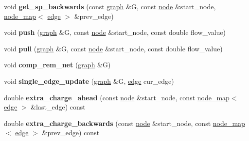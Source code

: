 \begin{DoxyCompactItemize}
\item 
\mbox{\label{classmaxflow__pp_a58b7af1b215766e99adcca0994ecfb7a}} 
void {\bfseries get\+\_\+sp\+\_\+backwards} (const \mbox{\hyperlink{classgraph}{graph}} \&G, const \mbox{\hyperlink{classnode}{node}} \&start\+\_\+node, \mbox{\hyperlink{classnode__map}{node\+\_\+map}}$<$ \mbox{\hyperlink{classedge}{edge}} $>$ \&prev\+\_\+edge)
\item 
\mbox{\label{classmaxflow__pp_ae7c9ce8d1cad511d70022e2f62567590}} 
void {\bfseries push} (\mbox{\hyperlink{classgraph}{graph}} \&G, const \mbox{\hyperlink{classnode}{node}} \&start\+\_\+node, const double flow\+\_\+value)
\item 
\mbox{\label{classmaxflow__pp_aba2aefadd6dde920b8b8aa44af95ad9b}} 
void {\bfseries pull} (\mbox{\hyperlink{classgraph}{graph}} \&G, const \mbox{\hyperlink{classnode}{node}} \&start\+\_\+node, const double flow\+\_\+value)
\item 
\mbox{\label{classmaxflow__pp_a97612b9517f0f11715610cb8faa81606}} 
void {\bfseries comp\+\_\+rem\+\_\+net} (\mbox{\hyperlink{classgraph}{graph}} \&G)
\item 
\mbox{\label{classmaxflow__pp_a3e59652a416d1553f8a1d1229dd2cd38}} 
void {\bfseries single\+\_\+edge\+\_\+update} (\mbox{\hyperlink{classgraph}{graph}} \&G, \mbox{\hyperlink{classedge}{edge}} cur\+\_\+edge)
\item 
\mbox{\label{classmaxflow__pp_af60a96de8ef929ceefd32d387e8e1638}} 
double {\bfseries extra\+\_\+charge\+\_\+ahead} (const \mbox{\hyperlink{classnode}{node}} \&start\+\_\+node, const \mbox{\hyperlink{classnode__map}{node\+\_\+map}}$<$ \mbox{\hyperlink{classedge}{edge}} $>$ \&last\+\_\+edge) const
\item 
\mbox{\label{classmaxflow__pp_a9d9651e53139201506b22eed1ecbdd51}} 
double {\bfseries extra\+\_\+charge\+\_\+backwards} (const \mbox{\hyperlink{classnode}{node}} \&start\+\_\+node, const \mbox{\hyperlink{classnode__map}{node\+\_\+map}}$<$ \mbox{\hyperlink{classedge}{edge}} $>$ \&prev\+\_\+edge) const
\item 
\mbox{\label{classmaxflow__pp_a20abf72dadaac19acb027ff5fa62de2a}} 

\end{DoxyCompactItemize}
